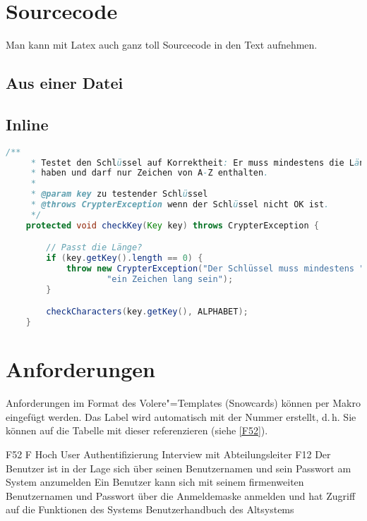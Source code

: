 \section{Sourcecode}

Man kann mit Latex auch ganz toll Sourcecode in den Text aufnehmen.

\subsection{Aus einer Datei}




\subsection{Inline}

\begin{lstlisting}[language=Java,caption=Methode checkKey()]
    /**
     * Testet den Schlüssel auf Korrektheit: Er muss mindestens die Länge 1
     * haben und darf nur Zeichen von A-Z enthalten.
     *
     * @param key zu testender Schlüssel
     * @throws CrypterException wenn der Schlüssel nicht OK ist.
     */
    protected void checkKey(Key key) throws CrypterException {

        // Passt die Länge?
        if (key.getKey().length == 0) {
            throw new CrypterException("Der Schlüssel muss mindestens " +
                    "ein Zeichen lang sein");
        }

        checkCharacters(key.getKey(), ALPHABET);
    }
\end{lstlisting}


\section{Anforderungen}

Anforderungen im Format des Volere"=Templates (Snowcards) \autocite{Volere} können per Makro eingefügt werden. Das Label wird automatisch mit der Nummer erstellt, d.\,h. Sie können auf die Tabelle mit dieser referenzieren (siehe \autoref{F52}).

\snowcard %
   {F52} %
   {F} %
   {Hoch} %
   {User Authentifizierung} %
   {Interview mit Abteilungsleiter} %
   {F12} %
   {Der Benutzer ist in der Lage sich über seinen
    Benutzernamen und sein Passwort am System anzumelden} %
   {Ein Benutzer kann sich mit seinem firmenweiten Benutzernamen und
   Passwort über die Anmeldemaske anmelden und hat Zugriff auf die
   Funktionen des Systems} %
   {Benutzerhandbuch des Altsystems} %

